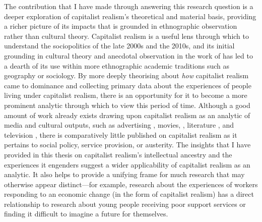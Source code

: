 The contribution that I have made through answering this research question is a deeper exploration of capitalist realism's theoretical and material basis, providing a richer picture of its impacts that is grounded in ethnographic observation rather than cultural theory. Capitalist realism is a useful lens through which to understand the sociopolitics of the late 2000s and the 2010s, and its initial grounding in cultural theory and anecdotal observation in the work of \citet{fisher_capitalist_2009} has led to a dearth of its use within more ethnographic academic traditions such as geography or sociology. By more deeply theorising about \textit{how} capitalist realism came to dominance and collecting primary data about the experiences of people living under capitalist realism, there is an opportunity for it to become a more prominent analytic through which to view this period of time. Although a good amount of work already exists drawing upon capitalist realism as an analytic of media and cultural outputs, such as advertising \citep{schudson_advertising_2013}, movies, \citep{flisfeder_love_2017}, literature \citep{tally_jr_for_2022}, and television \citep{la_berge_capitalist_2010}, there is comparatively little published on capitalist realism as it pertains to social policy, service provision, or austerity. The insights that I have provided in this thesis on  capitalist realism's intellectual ancestry and the experiences it engenders suggest a wider applicability of capitalist realism as an analytic. It also helps to provide a unifying frame for much research that may otherwise appear distinct—for example, research about the experiences of workers responding to an economic change (in the form of capitalist realism) has a direct relationship to research about young people receiving poor support services or finding it difficult to imagine a future for themselves.  

